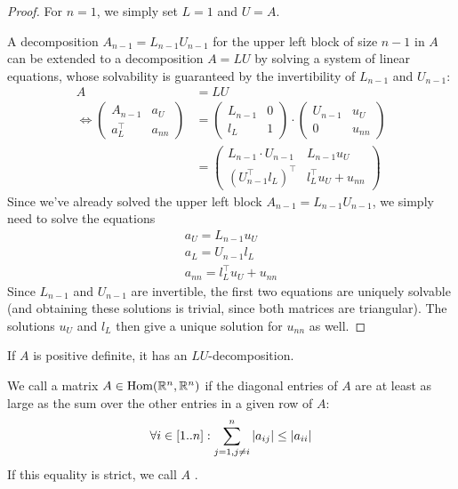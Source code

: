 \begin{proof}
	For $n = 1$, we simply set $L = 1$ and $U = A$.
	
	A decomposition $A_{n-1} = L_{n-1}U_{n-1}$ for the upper left block of size $n-1$ in $A$ can be extended to a decomposition $A = L U$ by solving a system of linear equations, whose solvability is guaranteed by the invertibility of $L_{n-1}$ and $U_{n-1}$:
	\begin{align*}
		A &= LU\\
		\Longleftrightarrow
		\begin{pmatrix}
			A_{n-1} & a_U\\
			a_L^\top & a_{nn}
		\end{pmatrix}
		&=
		\begin{pmatrix}
			L_{n-1} & 0\\
			l_L & 1
		\end{pmatrix}
		\cdot
		\begin{pmatrix}
			U_{n-1} & u_U\\
			0 & u_{nn}
		\end{pmatrix}\\
		&=
		\begin{pmatrix}
			L_{n-1} \cdot U_{n-1} & L_{n-1}u_U\\
			(U_{n-1}^\top l_L)^\top & l_L^\top u_U + u_{nn}
		\end{pmatrix}
	\end{align*}
	Since we've already solved the upper left block $A_{n-1} = L_{n-1}U_{n-1}$, we simply need to solve the equations
	\begin{align*}
		a_U = L_{n-1} u_U\\
		a_L = U_{n-1} l_L\\
		a_{nn} = l_L^\top u_U + u_{nn}
	\end{align*}
	Since $L_{n-1}$ and $U_{n-1}$ are invertible, the first two equations are uniquely solvable (and obtaining these solutions is trivial, since both matrices are triangular). The solutions $u_U$ and $l_L$ then give a unique solution for $u_{nn}$ as well.
\end{proof}
\begin{exercise}
	If $A$ is positive definite, it has an $LU$-decomposition.
\end{exercise}
\begin{definition}
	We call a matrix $A \in \textnormal{Hom}(\mathbb{R}^n,\mathbb{R}^n)$  if the diagonal entries of $A$ are at least as large as the sum over the other entries in a given row of $A$:
	\begin{align*}
		\forall i \in [1..n]:
		\sum_{j = 1, j \neq i}^n \abs{a_{ij}} \leq \abs{a_{ii}}
	\end{align*}
	If this equality is strict, we call $A$ .
\end{definition}
